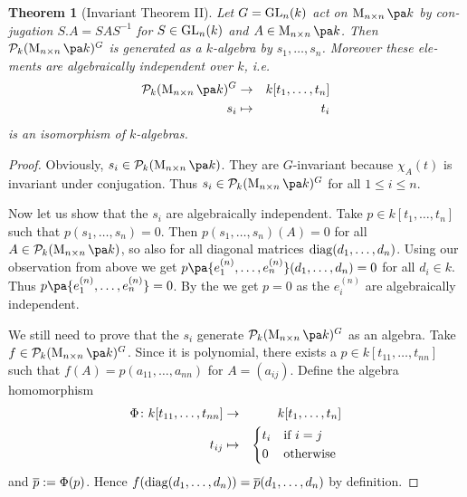 \documentclass[12pt,a4paper]{scrartcl}
\theoremstyle{cplain}
\theoremstyle{cplain}
\newtheorem{thm}[thmcounter]{Theorem}
\theoremstyle{cplain}
\theoremstyle{definition}
\begin{document}
\begin{otherlanguage}{english}
\begin{thm}[Invariant Theorem II] \label{thm:inv thm II}
  Let $G = \operatorname{GL}_n(k)$ act on $\Mat nk$ by conjugation $S.A = SAS^{-1}$ for $S \in \operatorname{GL}_n(k)$ and $A \in \Mat nk$. Then $\Ps_k(\Mat nk)^G$ is generated as a $k$-algebra by $s_1,\ldots,s_n$. Moreover these elements are algebraically independent over $k$, i.e.
  \begin{eqnarray*}
    \Ps_k(\Mat nk)^G &\to& k[t_1,\ldots,t_n] \\
    s_i &\mapsto& t_i
  \end{eqnarray*}
  is an isomorphism of $k$-algebras.
\end{thm}
\begin{proof}
  Obviously, $s_i \in \Ps_k(\Mat nk)$. They are $G$-invariant because $\chi_A(t)$ is invariant under conjugation. Thus $s_i \in \Ps_k(\Mat nk)^G$ for all $1\le i\le n$.
  
  Now let us show that the $s_i$ are algebraically independent. Take $p\in k[t_1,\ldots,t_n]$ such that $p(s_1,\ldots,s_n)=0$. Then $p(s_1,\ldots,s_n)(A) = 0$ for all $A \in \Ps_k(\Mat nk)$, so also for all diagonal matrices $\operatorname{diag}(d_1,\ldots,d_n)$. Using our observation from above we get $p\pa{e_1^{(n)},\ldots,e_n^{(n)}}(d_1,\ldots,d_n) = 0$ for all $d_i \in k$. Thus $p\pa{e_1^{(n)},\ldots,e_n^{(n)}} = 0$. By the  we get $p=0$ as the $e_i^{(n)}$ are algebraically independent.
  
  We still need to prove that the $s_i$ generate $\Ps_k(\Mat nk)^G$ as an algebra. Take $f\in \Ps_k(\Mat nk)^G$. Since it is polynomial, there exists a $p\in k[t_{11},\ldots,t_{nn}]$ such that $f(A) = p(a_{11},\ldots,a_{nn})$ for $A = (a_{ij})$. Define the algebra homomorphism
  \begin{eqnarray*}
    \Phi\colon k[t_{11},\ldots,t_{nn}] &\to& k[t_1,\ldots,t_n] \\
    t_{ij} &\mapsto& \begin{cases*} t_i & if $i=j$ \\ 0 & otherwise \end{cases*}
  \end{eqnarray*}
  and $\overline p := \Phi(p)$. Hence $f(\operatorname{diag}(d_1,\ldots,d_n)) = \overline p(d_1,\ldots,d_n)$ by definition.
  

\end{proof}
\end{otherlanguage}
\end{document}
